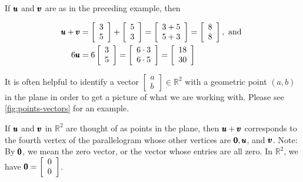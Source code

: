 \begin{example}
    If $\pmb{u}$ and $\pmb{v}$ are as in the preceding example, then 

$$
\begin{aligned}
\pmb{u} + \pmb{v} & =\left[\begin{array}{l}
3 \\
5
\end{array}\right] + \left[\begin{array}{l}
5 \\
3
\end{array}\right] = \left[\begin{array}{l}
3+5 \\
5+3
\end{array}\right] = \left[\begin{array}{l}
8 \\
8
\end{array}\right], \text { and } \\
6 \pmb{u} & = 6\left[\begin{array}{l}
3 \\
5
\end{array}\right] = \left[\begin{array}{l}
6 \cdot 3 \\
6 \cdot 5
\end{array}\right] = \left[\begin{array}{l}
18 \\
30
\end{array}\right]
\end{aligned}
$$

\end{example}

\begin{remark}
    It is often helpful to identify a vector $\left[\begin{array}{l}a \\ b\end{array}\right] \in \mathbb{R}^2$ with a geometric point $(a, b)$ in the plane in order to get a picture of what we are working with. Please see \autoref{fig:points-vectors} for an example.
\end{remark}

If $\pmb{u}$ and $\pmb{v}$ in $\mathbb{R}^2$ are thought of as points in the plane, then $\pmb{u} + \pmb{v}$ corresponds to the fourth vertex of the parallelogram whose other vertices are $\pmb{0}, \pmb{u}$, and $\pmb{v}$.
Note: By $\pmb{0}$, we mean the zero vector, or the vector whose entries are all zero. In $\mathbb{R}^2$, we have $\pmb{0} = \left[\begin{array}{l}
0 \\
0
\end{array}\right]$.

